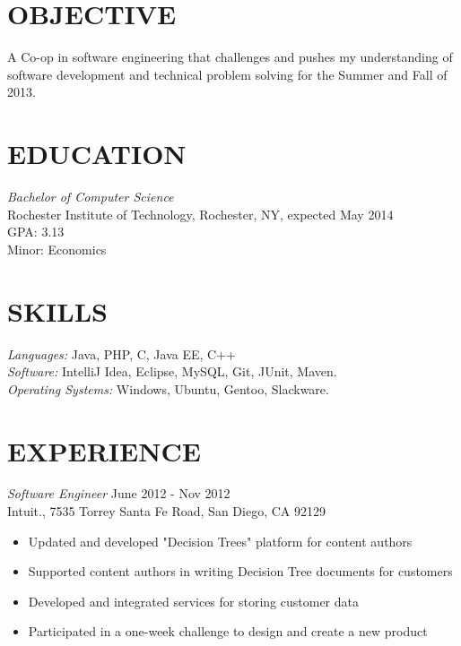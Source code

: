 \documentclass[line,margin]{res}
\begin{document}
\address{2569 Nathaniel Rochester Hall, Rochester, NY 14623}
\address{kurtz.grant@gmail.com |  (203) 240-7149}

 
\begin{resume}
 
\section{OBJECTIVE}       A Co-op in software engineering that challenges and pushes my understanding of software development and 
				technical problem solving for the Summer and Fall of 2013.
 
 
\section{EDUCATION} {\sl Bachelor of Computer Science} \\
	Rochester Institute of Technology, Rochester, NY,  expected May 2014 \\
	GPA: 3.13 \\
	Minor: Economics 
 
\section{SKILLS} {\sl Languages:} Java, PHP, C, Java EE, C++ \\
		{\sl Software:} IntelliJ Idea, Eclipse, MySQL, Git, JUnit, Maven. \\
		{\sl Operating Systems:} Windows, Ubuntu, Gentoo, Slackware.
 
\section{EXPERIENCE}

	{\sl Software Engineer} \hfill June 2012 - Nov 2012 \\
               Intuit., 
                7535 Torrey Santa Fe Road, San Diego, CA 92129
                 \begin{itemize}  \itemsep -2pt %
	\item Updated and developed "Decision Trees" platform for content authors
	\item Supported content authors in writing Decision Tree documents for customers
	\item Developed and integrated services for storing customer data
	\item Participated in a one-week challenge to design and create a new product
	\end{itemize}


\end{resume}
\end{document}
